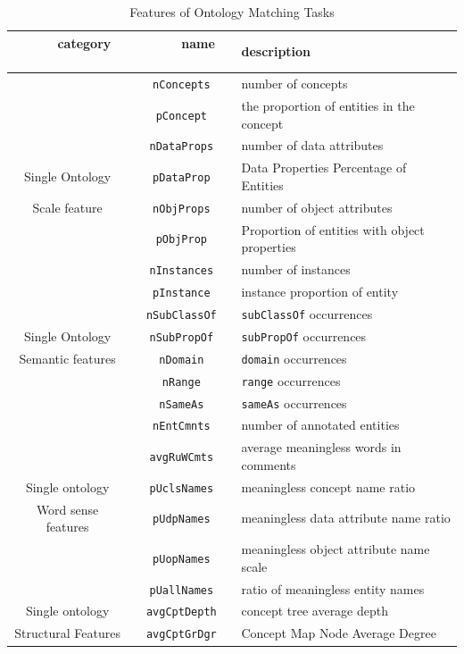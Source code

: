 \documentclass[twoside]{article}
\begin{document}
\begin{table}[htb!]
\centering
\caption{Features of Ontology Matching Tasks}
\label{table:onto_descriptors}
\begin{tabular}{@{}c|c|l@{}}
\toprule
~~~~ category ~~~~ &
~~~~ name ~~~~ &
description
\\ \midrule
				  	& \texttt {nConcepts} 	& number of concepts \\
				  	& \texttt {pConcept} 	& the proportion of entities in the concept \\
				  	& \texttt {nDataProps} 	& number of data attributes \\
Single Ontology   	& \texttt {pDataProp} 	& Data Properties Percentage of Entities \\
Scale feature     	& \texttt {nObjProps} 	& number of object attributes \\
				  	& \texttt {pObjProp} 	& Proportion of entities with object properties \\
				  	& \texttt {nInstances} 	& number of instances \\
				  	& \texttt {pInstance} 	& instance proportion of entity \\ \midrule
				  	& \texttt {nSubClassOf} & \texttt {subClassOf} occurrences \\
Single Ontology 	  	& \texttt {nSubPropOf}  & \texttt {subPropOf} occurrences \\
Semantic features 	& \texttt {nDomain} 	& \texttt {domain} occurrences \\
				  	& \texttt {nRange} 		& \texttt {range} occurrences \\
				  	& \texttt {nSameAs} 	& \texttt {sameAs} occurrences \\ \midrule
				  	& \texttt {nEntCmnts} 	& number of annotated entities \\
				  	& \texttt {avgRuWCmts} 	& average meaningless words in comments \\
Single ontology     & \texttt {pUclsNames} 	& meaningless concept name ratio \\
Word sense features & \texttt {pUdpNames} 	& meaningless data attribute name ratio \\
					& \texttt {pUopNames} 	& meaningless object attribute name scale \\
					& \texttt {pUallNames} 	& ratio of meaningless entity names \\ \midrule
Single ontology     & \texttt {avgCptDepth} & concept tree average depth \\
Structural Features & \texttt {avgCptGrDgr} & Concept Map Node Average Degree \\ \midrule

\end{tabular}
\end{table}
\end{document}
